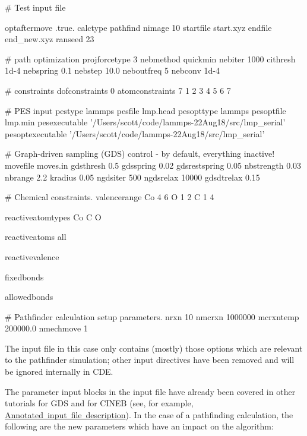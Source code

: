 \begin{DoxyVerb}# Test input file

optaftermove .true.
calctype pathfind 
nimage 10 
startfile start.xyz
endfile end_new.xyz
ranseed 23 

# path optimization
projforcetype 3
nebmethod quickmin 
nebiter 1000
cithresh 1d-4
nebspring 0.1
nebstep  10.0 
neboutfreq 5
nebconv 1d-4

# constraints
dofconstraints 0
atomconstraints 7
1 2 3 4 5 6 7

# PES input
pestype  lammps 
pesfile   lmp.head
pesopttype  lammps
pesoptfile lmp.min
pesexecutable '/Users/scott/code/lammps-22Aug18/src/lmp_serial' 
pesoptexecutable '/Users/scott/code/lammps-22Aug18/src/lmp_serial' 

# Graph-driven sampling (GDS) control - by default, everything inactive!    
movefile moves.in
gdsthresh 0.5 
gdsspring 0.02
gdsrestspring 0.05
nbstrength 0.03
nbrange 2.2
kradius 0.05
ngdsiter 500 
ngdsrelax 10000
gdsdtrelax 0.15

# Chemical constraints.
valencerange{
Co 4 6 
O 1 2
C 1 4
}

reactiveatomtypes{  
Co
C 
O  
}

reactiveatoms{  
all
}

reactivevalence{
}

fixedbonds{
}

allowedbonds{
} 

# Pathfinder calculation setup parameters.
nrxn 10 
nmcrxn 1000000
mcrxntemp 200000.0
nmechmove 1
\end{DoxyVerb}


The input file in this case only contains (mostly) those options which are relevant to the pathfinder simulation; other input directives have been removed and will be ignored internally in C\+DE.

The parameter input blocks in the input file have already been covered in other tutorials for G\+DS and for C\+I\+N\+EB (see, for example, \mbox{\hyperlink{_annotated}{Annotated input file description}}). In the case of a pathfinding calculation, the following are the new parameters which have an impact on the algorithm\+:


